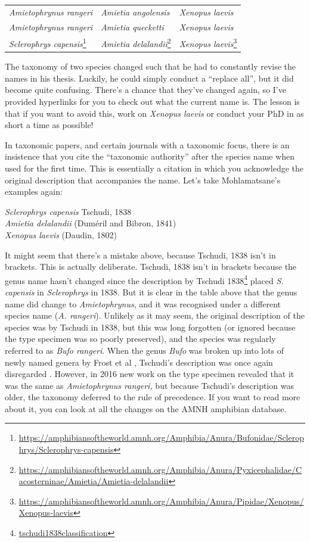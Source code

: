 \documentclass[
]{krantz}
\renewenvironment{quote}{\begin{VF}}{\end{VF}}
\renewcommand{\href}[2]{#2\footnote{\url{#1}}}
\begin{document}
\begin{longtable}[]{@{}lll@{}}
\midrule
\endhead
\emph{Amietophrynus rangeri} & \emph{Amietia angolensis} & \emph{Xenopus laevis} \\
\emph{Amietophrynus rangeri} & \emph{Amietia quecketti} & \emph{Xenopus laevis} \\
\href{https://amphibiansoftheworld.amnh.org/Amphibia/Anura/Bufonidae/Sclerophrys/Sclerophrys-capensis}{\emph{Sclerophrys capensis}} & \href{https://amphibiansoftheworld.amnh.org/Amphibia/Anura/Pyxicephalidae/Cacosterninae/Amietia/Amietia-delalandii}{\emph{Amietia delalandii}} & \href{https://amphibiansoftheworld.amnh.org/Amphibia/Anura/Pipidae/Xenopus/Xenopus-laevis}{\emph{Xenopus laevis}} \\
\bottomrule
\end{longtable}

The taxonomy of two species changed such that he had to constantly revise the names in his thesis. Luckily, he could simply conduct a ``replace all'', but it did become quite confusing. There's a chance that they've changed again, so I've provided hyperlinks for you to check out what the current name is. The lesson is that if you want to avoid this, work on \emph{Xenopus laevis} or conduct your PhD in as short a time as possible!

In taxonomic papers, and certain journals with a taxonomic focus, there is an insistence that you cite the ``taxonomic authority'' after the species name when used for the first time. This is essentially a citation in which you acknowledge the original description that accompanies the name. Let's take Mohlamatsane's examples again:

\begin{quote}
\emph{Sclerophrys capensis} Tschudi, 1838\\
\emph{Amietia delalandii} (Duméril and Bibron, 1841)\\
\emph{Xenopus laevis} (Daudin, 1802)
\end{quote}

It might seem that there's a mistake above, because Tschudi, 1838 isn't in brackets. This is actually deliberate. Tschudi, 1838 isn't in brackets because the genus name hasn't changed since the description by Tschudi \href{tschudi1838classification}{1838} placed \emph{S. capensis} in \emph{Sclerophrys} in 1838. But it is clear in the table above that the genus name did change to \emph{Amietophrynus}, and it was recognised under a different species name (\emph{A. rangeri}). Unlikely as it may seem, the original description of the species was by Tschudi in 1838, but this was long forgotten (or ignored because the type specimen was so poorly preserved), and the species was regularly referred to as \emph{Bufo rangeri}. When the genus \emph{Bufo} was broken up into lots of newly named genera by Frost et al \citeyearpar{frost2006amphibian}, Tschudi's description was once again disregarded \citep{ohler2016identity}. However, in 2016 new work on the type specimen revealed that it was the same as \emph{Amietophrynus rangeri,} but because Tschudi's description was older, the taxonomy deferred to the rule of precedence. If you want to read more about it, you can look at all the changes on the AMNH amphibian database.
\end{document}
